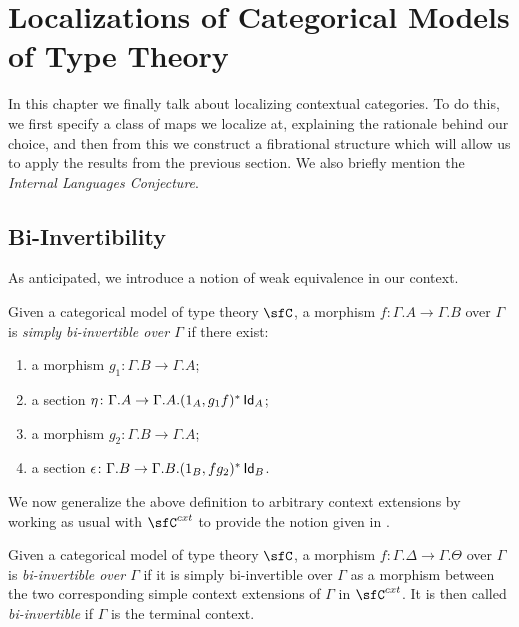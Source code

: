 \chapter{Localizations of Categorical Models of Type Theory}

In this chapter we finally talk about localizing contextual categories. To do
this, we first specify a class of maps we localize at, explaining the rationale
behind our choice, and then from this we construct a fibrational structure which
will allow us to apply the results from the previous section. We also briefly
mention the \emph{Internal Languages Conjecture}.

\section{Bi-Invertibility}

As anticipated, we introduce a notion of weak equivalence in our context.

\begin{defn}
  Given a categorical model of type theory $\sfC$, a morphism
  $f\colon\Gamma.A\rightarrow\Gamma.B$ over $\Gamma$ is \emph{simply
    bi-invertible over $\Gamma$} if there exist:
  \begin{enumerate}
    \item a morphism $g_1\colon\Gamma.B\rightarrow\Gamma.A$;
    \item a section
      $\eta\colon\Gamma.A\rightarrow\Gamma.A.(1_{A},g_1f)^*\operatorname{\mathsf{Id}}_{A}$;
    \item a morphism $g_2\colon\Gamma.B\rightarrow\Gamma.A$;
    \item a section
      $\epsilon\colon\Gamma.B\rightarrow\Gamma.B.(1_{B},fg_2)^*\operatorname{\mathsf{Id}}_{B}$.
  \end{enumerate}
\end{defn}

We now generalize the above definition to arbitrary context extensions by
working as usual with $\sfC^{cxt}$ to provide the notion given in
\cite[Def.~1.4]{Kap17}.

\begin{defn}
  Given a categorical model of type theory $\sfC$, a morphism
  $f\colon\Gamma.\Delta\rightarrow\Gamma.\Theta$ over $\Gamma$ is
  \emph{bi-invertible over $\Gamma$} if it is simply bi-invertible over $\Gamma$
  as a morphism between the two corresponding simple context extensions of
  $\Gamma$ in $\sfC^{cxt}$. It
  is then called \emph{bi-invertible} if $\Gamma$ is the terminal
  context.
\end{defn}

